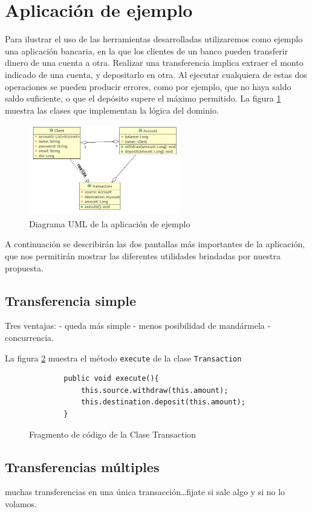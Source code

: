 \section{Aplicación de ejemplo}
Para ilustrar el uso de las herramientas desarrolladas utilizaremos como ejemplo
una aplicación bancaria, en la que los clientes de un banco pueden transferir
dinero de una cuenta a otra. 
Realizar una transferencia implica extraer el
monto indicado de una cuenta, y depositarlo en otra. 
Al ejecutar cualquiera de estas dos operaciones se pueden producir errores,
como por ejemplo, que no haya saldo saldo suficiente, o que el depósito supere
el máximo permitido.
La figura \ref{example} muestra las clases que implementan la lógica del
dominio.

	\begin{figure}[h]
		\centering
		\includegraphics[width=250px, height=150px]{img/transaccion}
		\caption{Diagrama UML de la aplicación de ejemplo}
		\label{example}
	\end{figure}	

A continuación se describirán las dos pantallas más importantes de la
aplicación, que nos permitirán mostrar las diferentes utilidades brindadas por
nuestra propuesta.
 
\subsection{Transferencia simple} 
	Tres ventajas:
	- queda más simple
	- menos posibilidad de mandármela
	- concurrencia.

La figura \ref{executeTransaction} muestra el método  \lstinline|execute| de la
clase \lstinline|Transaction| \begin{figure}[h]
	\begin{lstlisting}
		public void execute(){
			this.source.withdraw(this.amount);
			this.destination.deposit(this.amount);
		}
	\end{lstlisting}
	\caption{Fragmento de código de la Clase Transaction}
	\label{executeTransaction}
\end{figure}
  	
\subsection{Transferencias múltiples}
	muchas transferencias en una única transacción\ldots fijate si sale algo y si no
	lo volamos.

